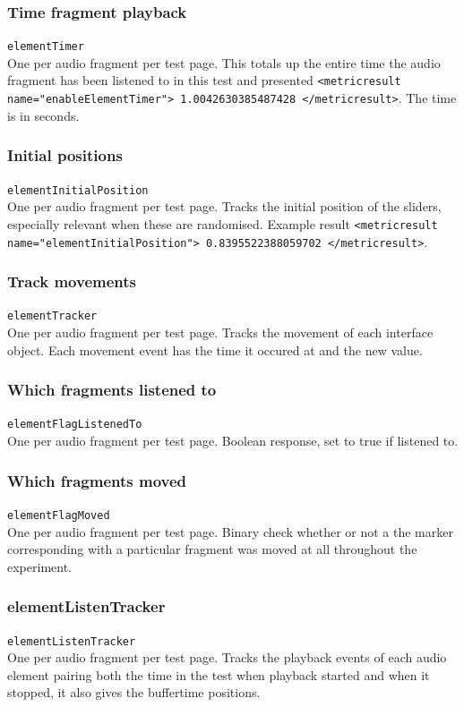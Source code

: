 \documentclass[11pt, oneside]{article}   	%
\begin{document}
		\subsubsection{Time fragment playback}
			\texttt{elementTimer}\\
			One per audio fragment per test page. This totals up the entire time the audio fragment has been listened to in this test and presented \texttt{<metricresult name="enableElementTimer"> 1.0042630385487428 </metricresult>}. The time is in seconds.

		\subsubsection{Initial positions}
			\texttt{elementInitialPosition}\\
			One per audio fragment per test page. Tracks the initial position of the sliders, especially relevant when these are randomised. Example result \texttt{<metricresult name="elementInitialPosition"> 0.8395522388059702 </metricresult>}.

		\subsubsection{Track movements}
		    \texttt{elementTracker}\\
		    One per audio fragment per test page. Tracks the movement of each interface object. Each movement event has the time it occured at and the new value.
		\subsubsection{Which fragments listened to}
		    \texttt{elementFlagListenedTo}\\
		    One per audio fragment per test page. Boolean response, set to true if listened to.
		\subsubsection{Which fragments moved}
		    \texttt{elementFlagMoved}\\
			One per audio fragment per test page. Binary check whether or not a the marker corresponding with a particular fragment was moved at all throughout the experiment. 

		\subsubsection{elementListenTracker}
		    \texttt{elementListenTracker}\\
		    One per audio fragment per test page. Tracks the playback events of each audio element pairing both the time in the test when playback started and when it stopped, it also gives the buffertime positions.
\end{document}
